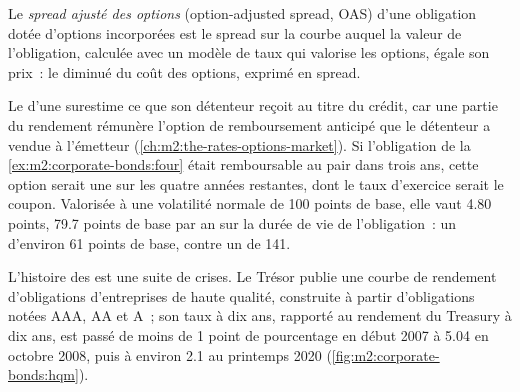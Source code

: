 \begin{definition}\label{def:m2:corporate-bonds:oas}
Le \emph{spread ajusté des options} (option-adjusted spread, OAS) d'une obligation dotée
d'options incorporées est le spread sur la courbe auquel la valeur de l'obligation, calculée
avec un modèle de taux qui valorise les options, égale son prix~: le  diminué
du coût des options, exprimé en spread.
\end{definition}

Le  d'une  surestime ce que son détenteur reçoit au titre du crédit, car
une partie du rendement rémunère l'option de remboursement anticipé que le détenteur a vendue à l'émetteur
(\cref{ch:m2:the-rates-options-market}). Si l'obligation de la
\cref{ex:m2:corporate-bonds:four} était remboursable au pair dans trois ans, cette option
serait une  sur les quatre années restantes, dont le taux d'exercice serait le coupon.
Valorisée à une volatilité normale de 100 points de base, elle vaut 4.80 points, 79.7
points de base par an sur la durée de vie de l'obligation~: un  d'environ 61
points de base, contre un  de 141.

L'histoire des  est une suite de crises. Le Trésor publie une
courbe de rendement d'obligations d'entreprises de haute qualité, construite à partir d'obligations notées AAA, AA et A~; son
taux à dix ans, rapporté au rendement du Treasury à dix ans, est passé de moins de 1 point de pourcentage en
début 2007 à 5.04 en octobre 2008, puis à environ 2.1 au printemps 2020
(\cref{fig:m2:corporate-bonds:hqm}).

